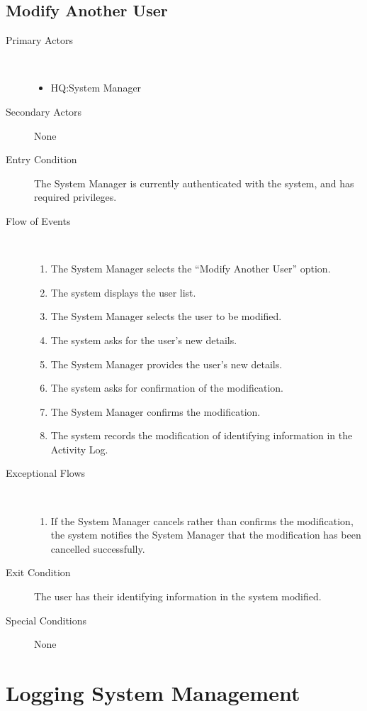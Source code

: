 \documentclass[a4paper,10pt]{report}
\begin{document}
\section{Modify Another User}
\begin{description}
\item[Primary Actors] \
  \begin{itemize}
  \item HQ:System Manager
  \end{itemize}
\item[Secondary Actors] None
\item[Entry Condition]
  The System Manager is currently authenticated with the system, and has required privileges.
\item[Flow of Events] \
  \begin{enumerate}
  \item The System Manager selects the ``Modify Another User'' option.
  \item The system displays the user list.
  \item The System Manager selects the user to be modified.
  \item The system asks for the user's new details.
  \item The System Manager provides the user's new details.
  \item The system asks for confirmation of the modification.
  \item The System Manager confirms the modification.
  \item The system records the modification of identifying information in the Activity Log.
  \end{enumerate}
\item[Exceptional Flows] \
  \begin{enumerate}
  \item If the System Manager cancels rather than confirms the modification, the system notifies the System Manager that the modification has been cancelled successfully.
  \end{enumerate}
\item[Exit Condition]
  The user has their identifying information in the system modified.
\item[Special Conditions] None
\end{description}

\chapter{Logging System Management}
\end{document}
